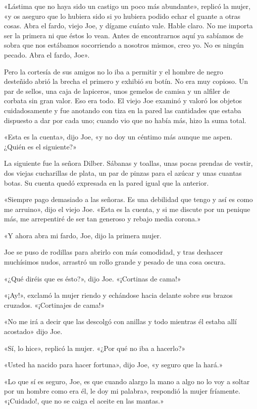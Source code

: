 \documentclass{novela}
\begin{document}
 «Lástima que no haya sido un castigo un poco más abundante», replicó la mujer, «y os aseguro que lo hubiera sido si yo hubiera podido echar el guante a otras cosas. Abra el fardo, viejo Joe, y dígame cuánto vale. Hable claro. No me importa ser la primera ni que éstos lo vean. Antes de encontrarnos aquí ya sabíamos de sobra que nos estábamos socorriendo a nosotros mismos, creo yo. No es ningún pecado. Abra el fardo, Joe».

 Pero la cortesía de sus amigos no lo iba a permitir y el hombre de negro desteñido abrió la brecha el primero y exhibió su botín. No era muy copioso. Un par de sellos, una caja de lapiceros, unos gemelos de camisa y un alfiler de corbata sin gran valor. Eso era todo. El viejo Joe examinó y valoró los objetos cuidadosamente y fue anotando con tiza en la pared las cantidades que estaba dispuesto a dar por cada uno; cuando vio que no había más, hizo la suma total.

 «Esta es la cuenta», dijo Joe, «y no doy un céntimo más aunque me aspen. ¿Quién es el siguiente?»

 La siguiente fue la señora Dilber. Sábanas y toallas, unas pocas prendas de vestir, dos viejas cucharillas de plata, un par de pinzas para el azúcar y unas cuantas botas. Su cuenta quedó expresada en la pared igual que la anterior.

 «Siempre pago demasiado a las señoras. Es una debilidad que tengo y así es como me arruino», dijo el viejo Joe. «Esta es la cuenta, y si me discute por un penique más, me arrepentiré de ser tan generoso y rebajo media corona.»

 «Y ahora abra mi fardo, Joe, dijo la primera mujer.

 Joe se puso de rodillas para abrirlo con más comodidad, y tras deshacer muchísimos nudos, arrastró un rollo grande y pesado de una cosa oscura.

 «¿Qué diréis que es ésto?», dijo Joe. «¡Cortinas de cama!»

 «¡Ay!», exclamó la mujer riendo y echándose hacia delante sobre sus brazos cruzados. «¡Cortinajes de cama!»

 «No me irá a decir que las descolgó con anillas y todo mientras él estaba allí acostado» dijo Joe.

 «Sí, lo hice», replicó la mujer. «¿Por qué no iba a hacerlo?»

 «Usted ha nacido para hacer fortuna», dijo Joe, «y seguro que la hará.»

 «Lo que sí es seguro, Joe, es que cuando alargo la mano a algo no lo voy a soltar por un hombre como era él, le doy mi palabra», respondió la mujer fríamente. «¡Cuidado!, que no se caiga el aceite en las mantas.»
\end{document}
